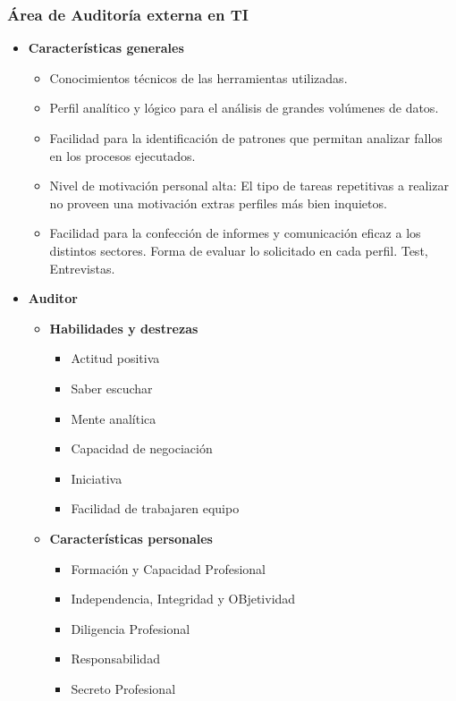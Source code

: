         \subsubsection{Área de Auditoría externa en TI}
            \begin{itemize}
            \item \textbf{Características generales          	}
                  \begin{itemize}
	                  \item Conocimientos técnicos de las herramientas utilizadas. 
                      \item Perfil analítico y lógico para el análisis de grandes volúmenes de datos. 
                      \item Facilidad para la identificación de patrones que permitan analizar fallos en los procesos ejecutados. 
                      \item  Nivel de motivación personal alta: El tipo de tareas repetitivas a realizar no proveen una motivación extras perfiles más bien inquietos. 
                      \item Facilidad para la confección de informes y comunicación eficaz a los distintos sectores. Forma de evaluar lo solicitado en cada perfil. Test, Entrevistas. 
                  \end{itemize}
           	\item \textbf{Auditor}
            	
                \begin{itemize}
                \item \textbf{Habilidades y destrezas }

                  \begin{itemize}
                      \item Actitud positiva
                       \item Saber escuchar
                       \item Mente analítica
                        \item Capacidad de negociación
                       \item Iniciativa
                       \item Facilidad de trabajaren equipo
                  \end{itemize}
				
                \item \textbf{Características personales}

                    \begin{itemize}
                        \item     Formación y Capacidad Profesional
                        \item    Independencia, Integridad y OBjetividad
                        \item    Diligencia Profesional
                        \item    Responsabilidad
                        \item    Secreto Profesional
                    \end{itemize}



\end{itemize}
\end{itemize}

